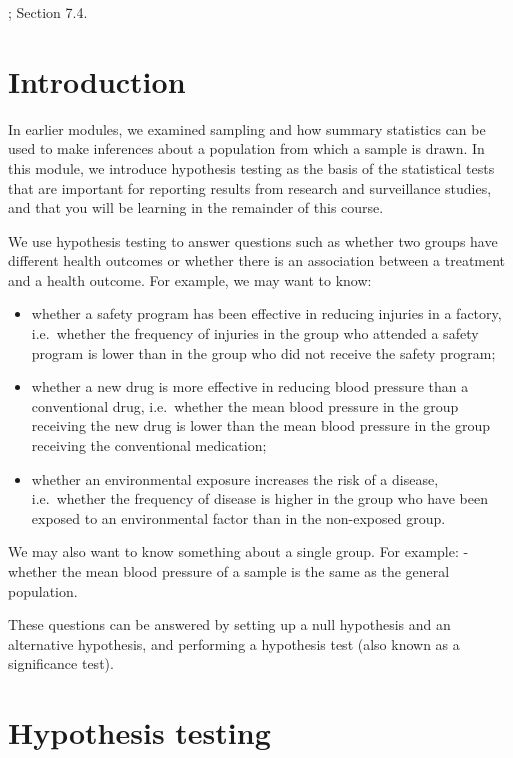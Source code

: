 \documentclass[
]{memoir}
\providecommand{\tightlist}{%
  \setlength{\itemsep}{0pt}\setlength{\parskip}{0pt}}
\begin{document}
\citet{acock10}; Section 7.4.

\hypertarget{introduction-2}{%
\section{Introduction}\label{introduction-2}}

In earlier modules, we examined sampling and how summary statistics can be used to make inferences about a population from which a sample is drawn. In this module, we introduce hypothesis testing as the basis of the statistical tests that are important for reporting results from research and surveillance studies, and that you will be learning in the remainder of this course.

We use hypothesis testing to answer questions such as whether two groups have different health outcomes or whether there is an association between a treatment and a health outcome. For example, we may want to know:

\begin{itemize}
\tightlist
\item
  whether a safety program has been effective in reducing injuries in a factory, i.e.~whether the frequency of injuries in the group who attended a safety program is lower than in the group who did not receive the safety program;
\item
  whether a new drug is more effective in reducing blood pressure than a conventional drug, i.e.~whether the mean blood pressure in the group receiving the new drug is lower than the mean blood pressure in the group receiving the conventional medication;
\item
  whether an environmental exposure increases the risk of a disease, i.e.~whether the frequency of disease is higher in the group who have been exposed to an environmental factor than in the non-exposed group.
\end{itemize}

We may also want to know something about a single group. For example:
- whether the mean blood pressure of a sample is the same as the general population.

These questions can be answered by setting up a null hypothesis and an alternative hypothesis, and performing a hypothesis test (also known as a significance test).

\hypertarget{hypothesis-testing-1}{%
\section{Hypothesis testing}\label{hypothesis-testing-1}}
\end{document}
